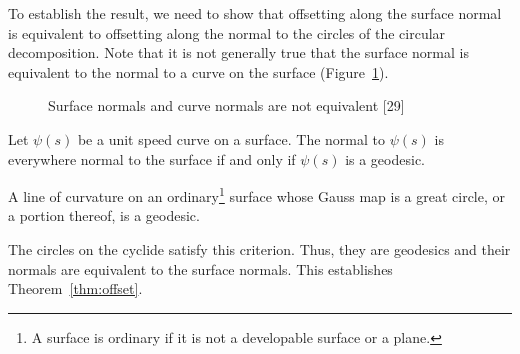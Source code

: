 To establish the result, 
we need to show that offsetting along the surface normal is equivalent
to offsetting along the normal to the circles of the circular decomposition.
Note that it is not generally true that the surface normal is equivalent 
to the normal to a curve on the surface
(Figure~\ref{normal}).


\begin{figure}
\vspace{2in}
\caption{Surface normals and curve normals are not equivalent [29]}
\label{normal}
\end{figure}

\begin{lemma}
\cite{MP77}
Let $\psi(s)$ be a unit speed curve on a surface.
The normal to $\psi(s)$ is everywhere normal to the surface if and only if
$\psi(s)$ is a geodesic.
\end{lemma}

\begin{lemma}
\label{lem:grau}
\cite{GRAU47}
A line of curvature on an ordinary\footnote{A surface is ordinary if it
	is not a developable surface or a plane.}
surface whose Gauss map is a great circle, or a portion thereof, is a geodesic.
\end{lemma}



The circles on the cyclide satisfy this criterion.
Thus, they are geodesics and their normals are equivalent to the surface
normals.
This establishes Theorem~\ref{thm:offset}.





